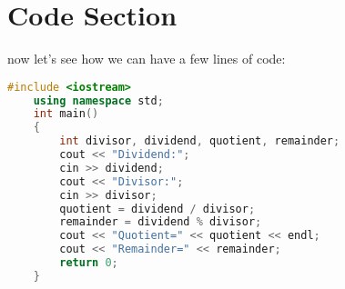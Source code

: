 \documentclass[12pt]{article}
\begin{document}
\newpage
\section{Code Section}
now let's see how we can have a few lines of code:\\
\begin{lstlisting}[language=C++]
    #include <iostream>
    using namespace std;
    int main()
    {    
        int divisor, dividend, quotient, remainder;
        cout << "Dividend:";
        cin >> dividend;
        cout << "Divisor:";
        cin >> divisor;
        quotient = dividend / divisor;
        remainder = dividend % divisor;
        cout << "Quotient=" << quotient << endl;
        cout << "Remainder=" << remainder;
        return 0;
    }
\end{lstlisting}
\end{document}
